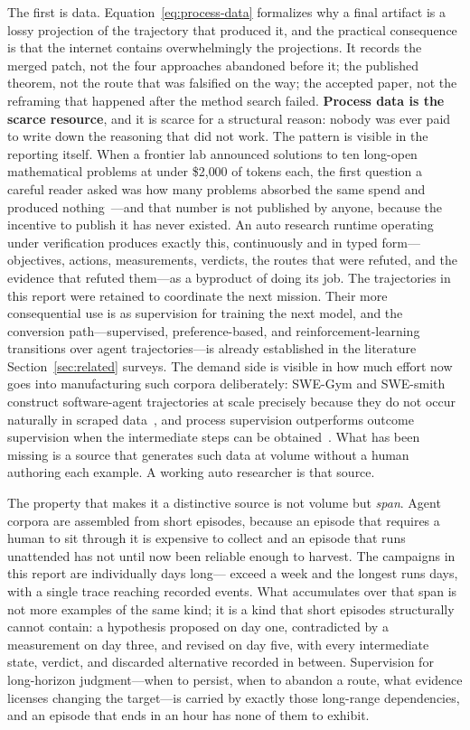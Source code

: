 The first is data. Equation~\ref{eq:process-data} formalizes why a final artifact is a
lossy projection of the trajectory that produced it, and the practical consequence is
that the internet contains overwhelmingly the projections. It records the merged
patch, not the four approaches abandoned before it; the published theorem, not the
route that was falsified on the way; the accepted paper, not the reframing that
happened after the method search failed. \textbf{Process data is the scarce
resource}, and it is scarce for a structural reason: nobody was ever paid to write
down the reasoning that did not work. The pattern is visible in the reporting itself.
When a frontier lab announced solutions to ten long-open mathematical problems at
under \$2{,}000 of tokens each, the first question a careful reader
asked was how many problems absorbed the same spend and produced
nothing~\citep{willison2026tenadvances}---and that number is not published by anyone,
because the incentive to publish it has never existed. An auto research runtime operating under
verification produces exactly this, continuously and in typed form---objectives,
actions, measurements, verdicts, the routes that were refuted, and the evidence that
refuted them---as a byproduct of doing its job. The trajectories in this report were
retained to coordinate the next mission. Their more consequential use is as
supervision for training the next model, and the conversion path---supervised,
preference-based, and reinforcement-learning transitions over agent trajectories---is
already established in the literature Section~\ref{sec:related} surveys. The demand
side is visible in how much effort now goes into manufacturing such corpora
deliberately: SWE-Gym and SWE-smith construct software-agent trajectories at scale
precisely because they do not occur naturally in scraped
data~\citep{pan2024swegym,yang2025swesmith}, and process supervision outperforms
outcome supervision when the intermediate steps can be
obtained~\citep{lightman2023verify}. What has been missing is a source that generates
such data at volume without a human authoring each example. A working auto researcher
is that source.

The property that makes it a distinctive source is not volume but \emph{span}. Agent
corpora are assembled from short episodes, because an episode that requires a human
to sit through it is expensive to collect and an episode that runs unattended has not
until now been reliable enough to harvest. The campaigns in this report are
individually days long---\CampaignsOverWeek{} exceed a week and the longest runs
\LongestCampaignDays{} days, with a single trace reaching
\LargestTraceEvents{} recorded events. What accumulates over that span is not more
examples of the same kind; it is a kind that short episodes structurally cannot
contain: a hypothesis proposed on day one, contradicted by a measurement on day
three, and revised on day five, with every intermediate state, verdict, and discarded
alternative recorded in between. Supervision for long-horizon judgment---when to
persist, when to abandon a route, what evidence licenses changing the target---is
carried by exactly those long-range dependencies, and an episode that ends in an hour
has none of them to exhibit.

